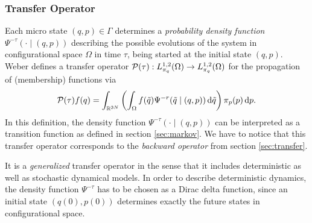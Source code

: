 \subsubsection*{Transfer Operator}
Each micro state $(q,p) \in \Gamma$ determines a \textit{probability density function} $\Psi^{-\tau}(\cdot \mid (q,p))$ describing the possible evolutions of the system in configurational space $\Omega$ in time $\tau$, being started at the initial state $(q,p)$.
Weber\cite{weber2011subspace} defines a transfer operator $\mathcal{P} (\tau): L^{1,2}_{\pi_q}(\Omega) \rightarrow L^{1,2}_{\pi_q}(\Omega)$ for the propagation of (membership) functions via 
\begin{equation}
\label{eq:transferoperator}
\mathcal{P}(\tau)f(q) = \int_{\mathbb{R}^{3N}} \left( \int_\Omega f(\tilde{q})\Psi^{-r}(\tilde{q}\mid (q,p)) \mathop{}\!\mathrm{d} \tilde{q} \right) \pi_p(p)\mathop{}\!\mathrm{d} p.
\end{equation}
In this definition, the density function $\Psi^{-\tau}(\cdot \mid (q,p))$ can be interpreted as a transition function as defined in section \ref{sec:markov}.
We have to notice that this transfer operator corresponds to the \textit{backward operator} from section \ref{sec:transfer}. 

It is a \textit{generalized} transfer operator in the sense that it includes deterministic as well as stochastic dynamical models. In order to describe deterministic dynamics, the density function $\Psi^{-\tau}$ has to be chosen as a Dirac delta function, since an initial state $(q(0),p(0))$ determines exactly the future states in configurational space.
\\

